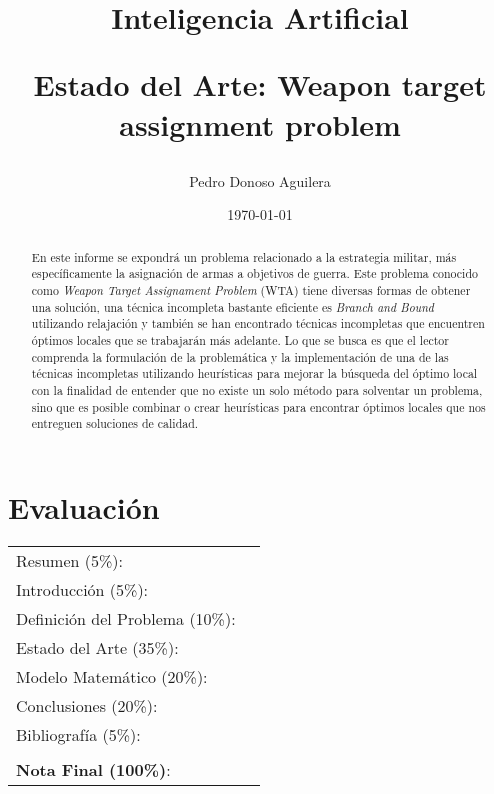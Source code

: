 \documentclass[letter, 10pt]{article}
\begin{document}
\title{Inteligencia Artificial \\ \begin{Large}Estado del Arte: \textbf{Weapon target assignment problem}\end{Large}}
\author{Pedro Donoso Aguilera}
\date{\today}
\maketitle


\section*{Evaluaci\'on}

\begin{tabular}{ll}
Resumen (5\%): & \underline{\hspace{2cm}} \\
Introducci\'on (5\%):  & \underline{\hspace{2cm}} \\
Definici\'on del Problema (10\%):  & \underline{\hspace{2cm}} \\
Estado del Arte (35\%):  & \underline{\hspace{2cm}} \\
Modelo Matem\'atico (20\%): &  \underline{\hspace{2cm}}\\
Conclusiones (20\%): &  \underline{\hspace{2cm}}\\
Bibliograf\'ia (5\%): & \underline{\hspace{2cm}}\\
 &  \\
\textbf{Nota Final (100\%)}:   & \underline{\hspace{2cm}}
\end{tabular}
\vspace{2cm}

\begin{abstract}
En este informe se expondrá un problema relacionado a la estrategia militar, más específicamente la asignación de armas a objetivos de guerra. Este problema conocido como \textit{Weapon Target Assignament Problem} (WTA) tiene diversas formas de obtener una solución, una técnica incompleta bastante eficiente \cite{andersen-2022} es \textit{Branch and Bound} utilizando relajación y también se han encontrado técnicas incompletas que encuentren óptimos locales que se trabajarán más adelante.
Lo que se busca es que el lector comprenda la formulación de la problemática y la implementación de una de las técnicas incompletas utilizando heurísticas para mejorar la búsqueda del óptimo local
 con la finalidad de entender que no existe un solo método para solventar un problema, sino que es posible combinar o crear heurísticas para encontrar óptimos locales que nos entreguen soluciones de calidad.
\end{abstract}
\end{document}
